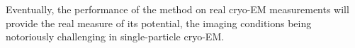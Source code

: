 Eventually, the performance of the method on real cryo-EM measurements will provide the real measure of its potential, the imaging conditions being notoriously challenging in single-particle cryo-EM\@.

